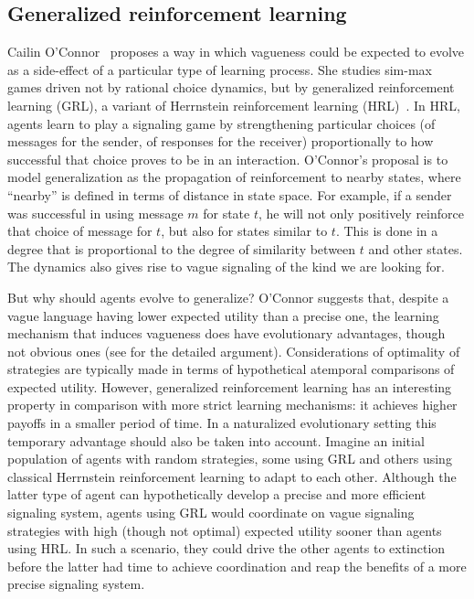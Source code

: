\documentclass[a4paper]{article}
\begin{document}
\subsection{Generalized reinforcement learning}
Cailin O'Connor~\parencite*{oconnor_evolution_2014} proposes a way in which vagueness could be expected to evolve as a side-effect of a particular type of learning process.
She studies sim-max games driven not by rational choice dynamics, but by generalized reinforcement learning (GRL), a variant of Herrnstein reinforcement learning (HRL)~\parencite{roth_learning_1995}.
In HRL, agents learn to play a signaling game by strengthening particular choices (of messages for the sender, of responses for the receiver) proportionally to how successful that choice proves to be in an interaction.
O'Connor's proposal is to model generalization as the propagation of reinforcement to nearby states, where ``nearby'' is defined in terms of distance in state space.
For example, if a sender was successful in using message $m$ for state $t$, he will not only positively reinforce that choice of message for $t$, but also for states similar to $t$.
This is done in a degree that is proportional to the degree of similarity between $t$ and other states.
The dynamics also gives rise to vague signaling of the kind we are looking for.

But why should agents evolve to generalize?
O'Connor suggests that, despite a vague language having lower expected utility than a precise one, the learning mechanism that induces vagueness does have evolutionary advantages, though not obvious ones (see \textcite{oconnor_evolving_2015} for the detailed argument).
Considerations of optimality of strategies are typically made in terms of hypothetical atemporal comparisons of expected utility.
However, generalized reinforcement learning has an interesting property in comparison with more strict learning mechanisms: it achieves higher payoffs in a smaller period of time.
In a naturalized evolutionary setting this temporary advantage should also be taken into account.
Imagine an initial population of agents with random strategies, some using GRL and others using classical Herrnstein reinforcement learning to adapt to each other.
Although the latter type of agent can hypothetically develop a precise and more efficient signaling system, agents using GRL would coordinate on vague signaling strategies with high (though not optimal) expected utility sooner than agents using HRL.
In such a scenario, they could drive the other agents to extinction before the latter had time to achieve coordination and reap the benefits of a more precise signaling system.
\end{document}
